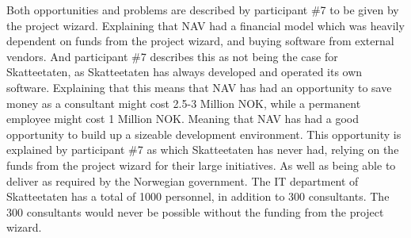 
Both opportunities and problems are described by participant \#7 to be given by the project wizard. Explaining that NAV had a financial model which was heavily dependent on funds from the project wizard, and buying software from external vendors. And participant \#7 describes this as not being the case for Skatteetaten, as Skatteetaten has always developed and operated its own software. Explaining that this means that NAV has had an opportunity to save money as a consultant might cost 2.5-3 Million NOK, while a permanent employee might cost 1 Million NOK. Meaning that NAV has had a good opportunity to build up a sizeable development environment. This opportunity is explained by participant \#7 as which Skatteetaten has never had, relying on the funds from the project wizard for their large initiatives. As well as being able to deliver as required by the Norwegian government. The IT department of Skatteetaten has a total of 1000 personnel, in addition to 300 consultants. The 300 consultants would never be possible without the funding from the project wizard.



